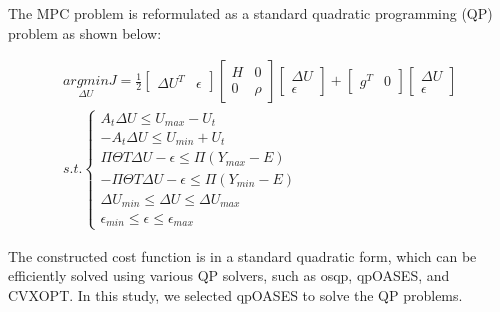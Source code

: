 The MPC problem is reformulated as a standard quadratic programming (QP) problem as shown below:
 
\vspace{-0.1cm}
\begin{equation}
\begin{matrix}
{\underset{\Delta U}{argmin}{J = \frac{1}{2}\begin{bmatrix}
{\Delta U^{T}} & \epsilon
\end{bmatrix}\begin{bmatrix}
H & 0 \\
0 & \rho
\end{bmatrix}\begin{bmatrix}
{\Delta U} \\
\epsilon
\end{bmatrix} + \begin{bmatrix}
g^{T} & 0
\end{bmatrix}\begin{bmatrix}
{\Delta U} \\
\epsilon
\end{bmatrix}}} \\
{s.t.\left\{ \begin{matrix}
{A_{t}\Delta U \leq U_{max} - U_{t}} \\
{{- A}_{t}\Delta U \leq U_{min} + U_{t}} \\
{\Pi\Theta T\Delta U - \epsilon \leq \Pi\left( Y_{max} - E \right)} \\
{- \Pi\Theta T\Delta U - \epsilon \leq \Pi\left( Y_{min} - E \right)} \\
{\Delta U_{min} \leq \Delta U \leq \Delta U_{max}} \\
{\epsilon_{min} \leq \epsilon \leq \epsilon_{max}}
\end{matrix} \right.}
\end{matrix}
\end{equation}

The constructed cost function is in a standard quadratic form, which can be efficiently solved using various QP solvers, such as osqp, qpOASES, and CVXOPT. In this study, we selected qpOASES to solve the QP problems.








